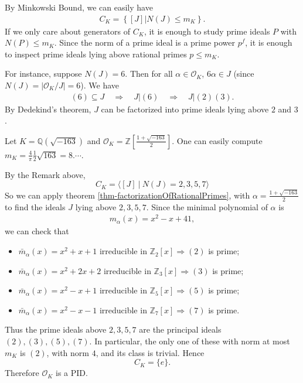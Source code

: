\begin{remark} \label{rmk-ckgenerator}
    By Minkowski Bound, we can easily have \begin{align*}
        C_K = \left\{[J]| N(J) \leq m_K\right\}.
    \end{align*}
    If we only care about generators of \(C_K\), it is enough to study prime ideals
    \(P\) with \(N(P)\leq m_K\). Since the norm of a prime ideal is a prime power
    \(p^f\), it is enough to inspect prime ideals lying above rational primes
    \(p\leq m_K\).
    
    For instance, suppose \(N(J) = 6\). Then for all \(\alpha \in \mathcal{O}_K\),
    \(6\alpha \in J\) (since \(N(J) = |\mathcal{O}_K/J|=6\)). We have
    \begin{align*}
        (6) \subseteq J \quad \Rightarrow \quad J|(6)\quad \Rightarrow \quad J|(2)(3).
    \end{align*}
    By Dedekind's theorem, \(J\) can be factorized into prime ideals lying above $2$ and $3$.
\end{remark}

\begin{example}
    Let \(K = \mathbb{Q}(\sqrt{-163})\) and \(\mathcal{O}_K = \displaystyle \mathbb{Z}[\frac{1+\sqrt{-163}}{2}]\). One can easily compute \(m_K = \frac{4}{\pi} \frac{1}{2} \sqrt{163} = 8. \cdots\).

    By the Remark above, 
    \[C_K = \langle [J]\ |\ N(J) = 2,3,5,7 \rangle\] 
    So we can apply theorem \ref{thm-factorizationOfRationalPrimes}, with \(\alpha = \frac{1+\sqrt{-163}}{2}\) to find the ideals $J$ lying above $2,3,5,7$. Since the minimal polynomial of $\alpha$ is
    \begin{align*}
        m_\alpha(x) = x^2 - x + 41,
    \end{align*}
    we can check that 
    \begin{itemize}
        \item[\((2)\):] \(\bar m_\alpha(x) = x^2 + x + 1\) irreducible in \(\mathbb{Z}_2[x] \Rightarrow (2)\) is prime;
        \item[\((3)\):] \(\bar m_\alpha(x) = x^2 + 2x + 2\) irreducible in \(\mathbb{Z}_3[x] \Rightarrow (3)\) is prime;
        \item[\((5)\):] \(\bar m_\alpha(x) = x^2 - x + 1\) irreducible in \(\mathbb{Z}_5[x] \Rightarrow (5)\) is prime;
        \item[\((7)\):] \(\bar m_\alpha(x) = x^2 - x - 1\) irreducible in \(\mathbb{Z}_7[x] \Rightarrow (7)\) is prime.
    \end{itemize}
    Thus the prime ideals above $2,3,5,7$ are the principal ideals $(2),(3),(5),(7)$. In particular, the only one of these with norm at most $m_K$ is $(2)$, with norm $4$, and its class is trivial. Hence
    \[
        C_K=\{e\}.
    \]
    Therefore \(\mathcal{O}_K\) is a PID.
\end{example}

